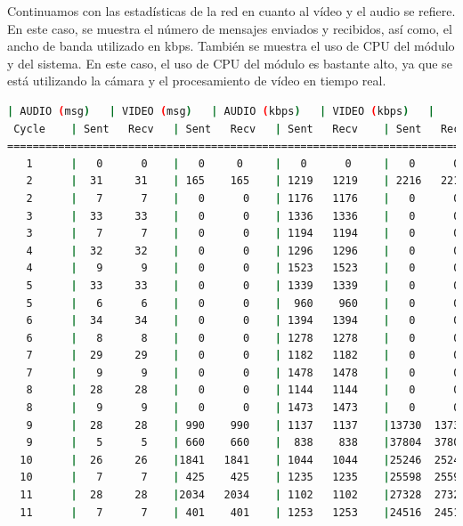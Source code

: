 Continuamos con las estadísticas de la red en cuanto al vídeo y el audio se refiere. En este caso, se muestra el número de mensajes enviados y recibidos, así como, el ancho de banda utilizado en kbps. También se muestra el uso de CPU del módulo y del sistema. En este caso, el uso de CPU del módulo es bastante alto, ya que se está utilizando la cámara y el procesamiento de vídeo en tiempo real. 
\begin{lstlisting}[language=bash,basicstyle=\ttfamily\scriptsize]
          | AUDIO (msg)   | VIDEO (msg)   | AUDIO (kbps)   | VIDEO (kbps)   |    CPU (%)
 Cycle    | Sent   Recv   | Sent   Recv   | Sent   Recv    | Sent   Recv    | Program System
============================================================================================
   1      |   0      0    |   0     0     |   0      0     |   0      0     |  0      0
   2      |  31     31    | 165    165    | 1219   1219    | 2216   2216    | 25     65
   2      |   7      7    |   0      0    | 1176   1176    |   0      0     | 35     64
   3      |  33     33    |   0      0    | 1336   1336    |   0      0     | 38     65
   3      |   7      7    |   0      0    | 1194   1194    |   0      0     | 15     65
   4      |  32     32    |   0      0    | 1296   1296    |   0      0     | 39     66
   4      |   9      9    |   0      0    | 1523   1523    |   0      0     | 51     69
   5      |  33     33    |   0      0    | 1339   1339    |   0      0     | 37     67
   5      |   6      6    |   0      0    |  960    960    |   0      0     | 39     65
   6      |  34     34    |   0      0    | 1394   1394    |   0      0     | 43     71
   6      |   8      8    |   0      0    | 1278   1278    |   0      0     | 43     73
   7      |  29     29    |   0      0    | 1182   1182    |   0      0     | 39     71
   7      |   9      9    |   0      0    | 1478   1478    |   0      0     | 50     70
   8      |  28     28    |   0      0    | 1144   1144    |   0      0     | 52     72
   8      |   9      9    |   0      0    | 1473   1473    |   0      0     | 54     73
   9      |  28     28    | 990    990    | 1137   1137    |13730  13730    | 48     71
   9      |   5      5    | 660    660    |  838    838    |37804  37804    | 51     69
  10      |  26     26    |1841   1841    | 1044   1044    |25246  25246    | 40     65
  10      |   7      7    | 425    425    | 1235   1235    |25598  25598    | 53     64
  11      |  28     28    |2034   2034    | 1102   1102    |27328  27328    | 50     69
  11      |   7      7    | 401    401    | 1253   1253    |24516  24516    | 60     72

\end{lstlisting}
